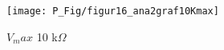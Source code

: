 


\begin{figure}[h]
 \begin{center}
  \texttt{[image: P\_Fig/figur16\_ana2graf10Kmax]}
  \caption{$V_max$ 10 k$\Omega$}
  \label{max10K}
 \end{center}
\end{figure}
